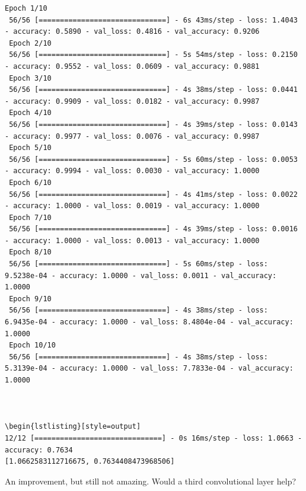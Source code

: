\documentclass{article}
\begin{document}
\begin{lstlisting}[style=output]
 Epoch 1/10
 56/56 [==============================] - 6s 43ms/step - loss: 1.4043 - accuracy: 0.5890 - val_loss: 0.4816 - val_accuracy: 0.9206
 Epoch 2/10
 56/56 [==============================] - 5s 54ms/step - loss: 0.2150 - accuracy: 0.9552 - val_loss: 0.0609 - val_accuracy: 0.9881
 Epoch 3/10
 56/56 [==============================] - 4s 38ms/step - loss: 0.0441 - accuracy: 0.9909 - val_loss: 0.0182 - val_accuracy: 0.9987
 Epoch 4/10
 56/56 [==============================] - 4s 39ms/step - loss: 0.0143 - accuracy: 0.9977 - val_loss: 0.0076 - val_accuracy: 0.9987
 Epoch 5/10
 56/56 [==============================] - 5s 60ms/step - loss: 0.0053 - accuracy: 0.9994 - val_loss: 0.0030 - val_accuracy: 1.0000
 Epoch 6/10
 56/56 [==============================] - 4s 41ms/step - loss: 0.0022 - accuracy: 1.0000 - val_loss: 0.0019 - val_accuracy: 1.0000
 Epoch 7/10
 56/56 [==============================] - 4s 39ms/step - loss: 0.0016 - accuracy: 1.0000 - val_loss: 0.0013 - val_accuracy: 1.0000
 Epoch 8/10
 56/56 [==============================] - 5s 60ms/step - loss: 9.5238e-04 - accuracy: 1.0000 - val_loss: 0.0011 - val_accuracy: 1.0000
 Epoch 9/10
 56/56 [==============================] - 4s 38ms/step - loss: 6.9435e-04 - accuracy: 1.0000 - val_loss: 8.4804e-04 - val_accuracy: 1.0000
 Epoch 10/10
 56/56 [==============================] - 4s 38ms/step - loss: 5.3139e-04 - accuracy: 1.0000 - val_loss: 7.7833e-04 - val_accuracy: 1.0000



\begin{lstlisting}[style=output]
12/12 [==============================] - 0s 16ms/step - loss: 1.0663 - accuracy: 0.7634
[1.0662583112716675, 0.7634408473968506]
\end{lstlisting}

An improvement, but still not amazing. Would a third convolutional layer help?


\end{document}

